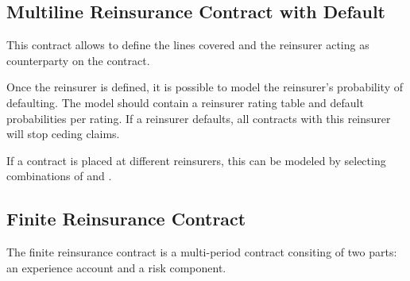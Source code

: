 \subsection{Multiline Reinsurance Contract with Default}
\label{sec:MultilineReinsuranceContractWithDefault}

This contract allows to define the lines covered and the reinsurer acting as counterparty on the contract.

Once the reinsurer is defined, it is possible to model the reinsurer's probability of defaulting.
The model should contain a reinsurer rating table and default probabilities per rating.
If a reinsurer defaults, all contracts with this reinsurer will stop ceding claims.

If a contract is placed at different reinsurers, this can be modeled by selecting combinations of  and .

\subsection{Finite Reinsurance Contract}
\label{sec:FiniteReinsuranceContract}

The finite reinsurance contract is a multi-period contract consiting of two parts: an experience account and a risk component.

